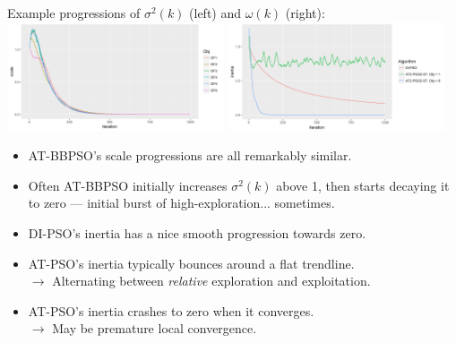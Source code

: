 \documentclass[xcolor=dvipsnames]{beamer}
\begin{document}
\begin{frame}
Example progressions of $\sigma^2(k)$ (left) and $\omega(k)$ (right):
\includegraphics[width = 0.48\textwidth]{../doc/scaleplot.png}
\includegraphics[width = 0.48\textwidth]{../doc/inertiaplot.png}
\pause
\begin{itemize}
\item  AT-BBPSO's scale progressions are all remarkably similar.\pause
\item  Often AT-BBPSO initially increases $\sigma^2(k)$ above 1, then starts decaying it to zero --- initial burst of high-exploration... sometimes.\pause
\item  DI-PSO's inertia has a nice smooth progression towards zero. \pause
\item  AT-PSO's inertia typically bounces around a flat trendline.\\
$\to$ Alternating between \emph{relative} exploration and exploitation. \pause
\item  AT-PSO's inertia crashes to zero when it converges. \\
$\to$ May be premature local convergence.
\end{itemize}
\end{frame}
\end{document}
